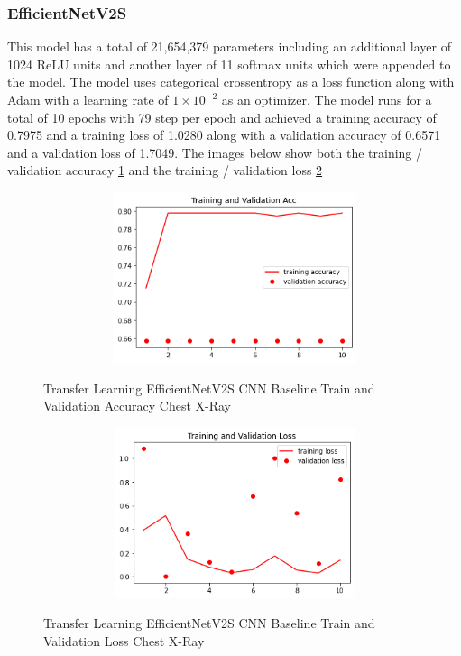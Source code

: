 \subsubsection{EfficientNetV2S}
This model has a total of 21,654,379 parameters including an additional layer of 1024 ReLU units and another layer of 11 softmax units which were appended to the model.  The model uses categorical crossentropy as a loss function along with Adam with a learning rate of $1 \times 10^{-2}$ as an optimizer.  The model runs for a total of 10 epochs with 79 step per epoch and achieved a training accuracy of 0.7975 and a training loss of 1.0280 along with a validation accuracy of 0.6571 and a validation loss of 1.7049. The images below show both the training / validation accuracy \ref{fig:EfficientNetV2S CNN Baseline Train and Validation Accuracy Chest X-Ray} and the training / validation loss \ref{fig:EfficientNetV2S CNN Baseline Train and Validation Loss Chest X-Ray}
 \begin{figure}[H]
    \centering
    \includegraphics[width=1\textwidth,height=5cm,keepaspectratio]{Images/EfficientNetV2SBaselineTrainingValidationAccuracyChestX-Ray.png}\\
    \caption{Transfer Learning EfficientNetV2S CNN Baseline Train and Validation Accuracy Chest X-Ray}
    \label{fig:EfficientNetV2S CNN Baseline Train and Validation Accuracy Chest X-Ray}
\end{figure}
 \begin{figure}[H]
    \centering
    \includegraphics[width=1\textwidth,height=5cm,keepaspectratio]{Images/EfficientNetV2SBaselineTrainingValidationLossXRayCOVID19.png}\\
    \caption{Transfer Learning EfficientNetV2S CNN Baseline Train and Validation Loss Chest X-Ray}
    \label{fig:EfficientNetV2S CNN Baseline Train and Validation Loss Chest X-Ray}
\end{figure}
